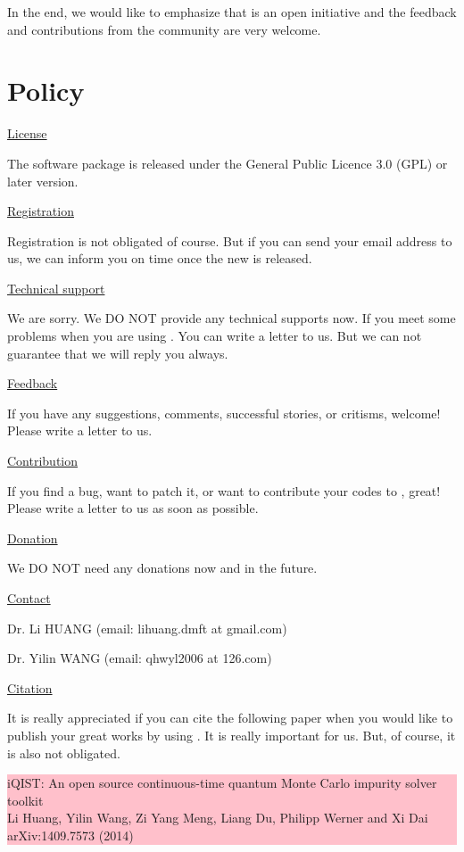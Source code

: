 In the end, we would like to emphasize that {\iqist} is an open initiative and the feedback and contributions from the community are very welcome.

\section{Policy}

\underline{License}

The {\iqist} software package is released under the General Public Licence 3.0 (GPL) or later version.

\underline{Registration}

Registration is not obligated of course. But if you can send your email address to us, we can inform you on time once the new {\iqist} is released.

\underline{Technical support}

We are sorry. We DO NOT provide any technical supports now. If you meet some problems when you are using {\iqist}. You can write a letter to us. But we can not guarantee that we will reply you always.

\underline{Feedback}

If you have any suggestions, comments, successful stories, or critisms, welcome! Please write a letter to us.

\underline{Contribution}

If you find a bug, want to patch it, or want to contribute your codes to {\iqist}, great! Please write a letter to us as soon as possible.

\underline{Donation}

We DO NOT need any donations now and in the future.

\underline{Contact}

Dr. Li HUANG (email: lihuang.dmft at gmail.com)

Dr. Yilin WANG (email: qhwyl2006 at 126.com)

\underline{Citation}

It is really appreciated if you can cite the following paper when you would like to publish your great works by using {\iqist}. It is really important for us. But, of course, it is also not obligated.

\noindent\colorbox{pink}{\parbox[r]{\linewidth} {
iQIST: An open source continuous-time quantum Monte Carlo impurity solver toolkit \\
Li Huang, Yilin Wang, Zi Yang Meng, Liang Du, Philipp Werner and Xi Dai \\
arXiv:1409.7573 (2014)}}
